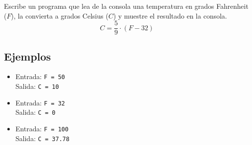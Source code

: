 Escribe un programa que lea de la consola una temperatura en grados Fahrenheit (\(F\)), la convierta a grados Celsius (\(C\)) y muestre el resultado en la consola.\\ 
\[
C = \frac{5}{9} \cdot (F - 32)
\]
\subsection*{Ejemplos}
\begin{itemize}
    \item Entrada: \texttt{F = 50}\\
          Salida: \texttt{C = 10}
    \item Entrada: \texttt{F = 32}\\
          Salida: \texttt{C = 0}
    \item Entrada: \texttt{F = 100}\\
          Salida: \texttt{C = 37.78}
\end{itemize}